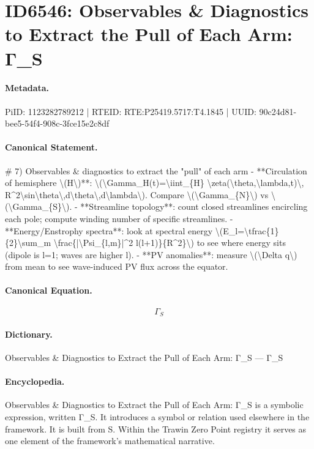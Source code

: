 \section*{ID6546: Observables \& Diagnostics to Extract the Pull of Each Arm: Γ\_S}
\paragraph{Metadata.}
PiID: 1123282789212 | RTEID: RTE:P25419.5717:T4.1845 | UUID: 90c24d81-bee5-54f4-908c-3fce15e2c8df

\paragraph{Canonical Statement.}
\# 7) Observables \& diagnostics to extract the "pull" of each arm - **Circulation of hemisphere \textbackslash{}(H\textbackslash{})**: \textbackslash{}(\textbackslash{}Gamma\_H(t)=\textbackslash{}iint\_\{H\} \textbackslash{}zeta(\textbackslash{}theta,\textbackslash{}lambda,t)\textbackslash{}, R\textasciicircum{}2\textbackslash{}sin\textbackslash{}theta\textbackslash{},d\textbackslash{}theta\textbackslash{},d\textbackslash{}lambda\textbackslash{}). Compare \textbackslash{}(\textbackslash{}Gamma\_\{N\}\textbackslash{}) vs \textbackslash{}(\textbackslash{}Gamma\_\{S\}\textbackslash{}). - **Streamline topology**: count closed streamlines encircling each pole; compute winding number of specific streamlines. - **Energy/Enstrophy spectra**: look at spectral energy \textbackslash{}(E\_l=\textbackslash{}tfrac\{1\}\{2\}\textbackslash{}sum\_m \textbackslash{}frac\{|\textbackslash{}Psi\_\{l,m\}|\textasciicircum{}2 l(l+1)\}\{R\textasciicircum{}2\}\textbackslash{}) to see where energy sits (dipole is l=1; waves are higher l). - **PV anomalies**: measure \textbackslash{}(\textbackslash{}Delta q\textbackslash{}) from mean to see wave-induced PV flux across the equator.

\paragraph{Canonical Equation.}
\[
\Gamma_{S}
\]

\paragraph{Dictionary.}
Observables \& Diagnostics to Extract the Pull of Each Arm: Γ\_S — Γ\_S

\paragraph{Encyclopedia.}
Observables \& Diagnostics to Extract the Pull of Each Arm: Γ\_S is a symbolic expression, written Γ\_S. It introduces a symbol or relation used elsewhere in the framework. It is built from S. Within the Trawin Zero Point registry it serves as one element of the framework's mathematical narrative.
